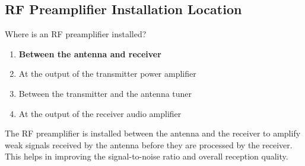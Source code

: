 \subsection{RF Preamplifier Installation Location}
\label{T7A11}

\begin{tcolorbox}[colback=gray!10!white,colframe=black!75!black,title=T7A11]
Where is an RF preamplifier installed?
\begin{enumerate}[noitemsep]
    \item \textbf{Between the antenna and receiver}
    \item At the output of the transmitter power amplifier
    \item Between the transmitter and the antenna tuner
    \item At the output of the receiver audio amplifier
\end{enumerate}
\end{tcolorbox}

The RF preamplifier is installed between the antenna and the receiver to amplify weak signals received by the antenna before they are processed by the receiver. This helps in improving the signal-to-noise ratio and overall reception quality.
